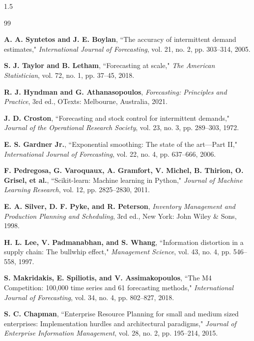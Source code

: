 \renewcommand{\bibname}{REFERENCES}
\cleardoublepage %
\begin{spacing}{1.5}
\begin{thebibliography}{99}

 \textbf{A. A. Syntetos and J. E. Boylan}, ``The accuracy of intermittent demand estimates," \textit{International Journal of Forecasting}, vol. 21, no. 2, pp. 303--314, 2005.

 \textbf{S. J. Taylor and B. Letham}, ``Forecasting at scale," \textit{The American Statistician}, vol. 72, no. 1, pp. 37--45, 2018.

 \textbf{R. J. Hyndman and G. Athanasopoulos}, \textit{Forecasting: Principles and Practice}, 3rd ed., OTexts: Melbourne, Australia, 2021.

 \textbf{J. D. Croston}, ``Forecasting and stock control for intermittent demands," \textit{Journal of the Operational Research Society}, vol. 23, no. 3, pp. 289--303, 1972.

 \textbf{E. S. Gardner Jr.}, ``Exponential smoothing: The state of the art---Part II," \textit{International Journal of Forecasting}, vol. 22, no. 4, pp. 637--666, 2006.

 \textbf{F. Pedregosa, G. Varoquaux, A. Gramfort, V. Michel, B. Thirion, O. Grisel, et al.}, ``Scikit-learn: Machine learning in Python," \textit{Journal of Machine Learning Research}, vol. 12, pp. 2825--2830, 2011.

 \textbf{E. A. Silver, D. F. Pyke, and R. Peterson}, \textit{Inventory Management and Production Planning and Scheduling}, 3rd ed., New York: John Wiley \& Sons, 1998.

 \textbf{H. L. Lee, V. Padmanabhan, and S. Whang}, ``Information distortion in a supply chain: The bullwhip effect," \textit{Management Science}, vol. 43, no. 4, pp. 546--558, 1997.

 \textbf{S. Makridakis, E. Spiliotis, and V. Assimakopoulos}, ``The M4 Competition: 100,000 time series and 61 forecasting methods," \textit{International Journal of Forecasting}, vol. 34, no. 4, pp. 802--827, 2018.

 \textbf{S. C. Chapman}, ``Enterprise Resource Planning for small and medium sized enterprises: Implementation hurdles and architectural paradigms," \textit{Journal of Enterprise Information Management}, vol. 28, no. 2, pp. 195--214, 2015.


\end{thebibliography}
\end{spacing}
